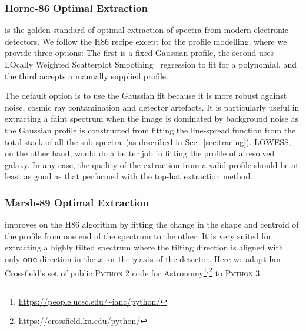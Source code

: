 \documentclass[twocolumn, linenumbers]{aastex631}
\begin{document}
\subsubsection*{Horne-86 Optimal Extraction}
\citet[hereafter H86]{1986PASP...98..609H} is the golden standard
of optimal extraction of spectra from modern electronic detectors.
We follow the H86 recipe except for the profile modelling,
where we provide three options: The first is a fixed Gaussian
profile, the second uses LOcally Weighted Scatterplot
Smoothing~\citep[LOWESS]{doi:10.1080/01621459.1979.10481038}
regression to fit for a polynomial, and the third accepts
a manually supplied profile.

The default option is to use the Gaussian fit because it is
more robust against noise, cosmic ray contamination and detector
artefacts. It is particularly useful in extracting a faint
spectrum when the image is dominated by background noise as the
Gaussian profile is constructed from fitting the line-spread
function from the total stack of all the
sub-spectra~(as described in Sec.~\ref{sec:tracing}).
LOWESS, on the other hand, would do a better job in fitting
the profile of a resolved galaxy. In any case, the quality
of the extraction from a valid profile should be at least as
good as that performed with the top-hat extraction method.

\subsubsection*{Marsh-89 Optimal Extraction}
\citet[hereafter M89]{1989PASP..101.1032M} improves on the H86
algorithm by fitting the change in the shape and centroid of the
profile from one end of the spectrum to the other. It is very
suited for extracting a highly tilted spectrum where the tilting
direction is aligned with only \textbf{one} direction in the $x$-
or the $y$-axis of the detector. Here we adapt Ian Crossfield's set of public
\textsc{Python 2} code for Astronomy\footnote{\url{https://people.ucsc.edu/~ianc/python/}}$^,$\footnote{\url{https://crossfield.ku.edu/python/}}
to \textsc{Python 3}.
\end{document}
